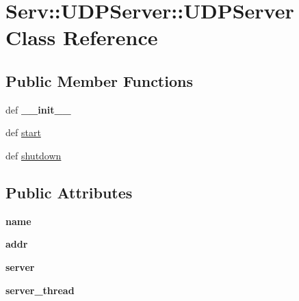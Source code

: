 \hypertarget{class_serv_1_1_u_d_p_server_1_1_u_d_p_server}{
\section{Serv::UDPServer::UDPServer Class Reference}
\label{class_serv_1_1_u_d_p_server_1_1_u_d_p_server}
}
\subsection*{Public Member Functions}
\begin{CompactItemize}
\item 
\hypertarget{class_serv_1_1_u_d_p_server_1_1_u_d_p_server_08fcc38fca5727c085acc11c9df7f512}{
def \textbf{\_\-\_\-init\_\-\_\-}}
\label{class_serv_1_1_u_d_p_server_1_1_u_d_p_server_08fcc38fca5727c085acc11c9df7f512}

\item 
def \hyperlink{class_serv_1_1_u_d_p_server_1_1_u_d_p_server_9feda8e8dfee13803aa3fd07ddd003a1}{start}
\item 
def \hyperlink{class_serv_1_1_u_d_p_server_1_1_u_d_p_server_43b3b2016322a79953939e56653d226d}{shutdown}
\end{CompactItemize}
\subsection*{Public Attributes}
\begin{CompactItemize}
\item 
\hypertarget{class_serv_1_1_u_d_p_server_1_1_u_d_p_server_092c452f84b153880539e7f9968fd4a1}{
\textbf{name}}
\label{class_serv_1_1_u_d_p_server_1_1_u_d_p_server_092c452f84b153880539e7f9968fd4a1}

\item 
\hypertarget{class_serv_1_1_u_d_p_server_1_1_u_d_p_server_19f6bc70abc4eb1d1c0806a9364d1fbe}{
\textbf{addr}}
\label{class_serv_1_1_u_d_p_server_1_1_u_d_p_server_19f6bc70abc4eb1d1c0806a9364d1fbe}

\item 
\hypertarget{class_serv_1_1_u_d_p_server_1_1_u_d_p_server_61a94c838a7067f18e9e1ac122aa2397}{
\textbf{server}}
\label{class_serv_1_1_u_d_p_server_1_1_u_d_p_server_61a94c838a7067f18e9e1ac122aa2397}

\item 
\hypertarget{class_serv_1_1_u_d_p_server_1_1_u_d_p_server_f86ce8e66ef2b3dfd537260e2a0e6fc9}{
\textbf{server\_\-thread}}
\label{class_serv_1_1_u_d_p_server_1_1_u_d_p_server_f86ce8e66ef2b3dfd537260e2a0e6fc9}

\end{CompactItemize}


